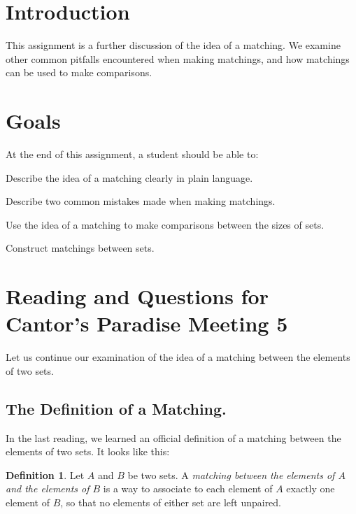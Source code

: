 \documentclass[12pt,letterpaper]{article}
\theoremstyle{definition}
\newtheorem*{definition}{Definition}
\begin{document}
\setlength{\parskip}{1ex plus 0.5ex minus 0.2ex}
\setlength{\parindent}{0pt}

\pagestyle{fancy}
\cfoot{}

\section*{Introduction}
This assignment is a further discussion of the idea of a matching.
We examine other common pitfalls encountered when making matchings, and how matchings can be used to make comparisons.

\section*{Goals}
At the end of this assignment, a student should be able to:
\begin{compactitem}
\item Describe the idea of a matching clearly in plain language.
\item Describe two common mistakes made when making matchings.
\item Use the idea of a matching to make comparisons between the sizes of sets.
\item Construct matchings between sets.
\end{compactitem}


\section*{Reading and Questions for Cantor's Paradise Meeting 5}

Let us continue our examination of the idea of a matching between the elements of two sets.

\subsection*{The Definition of a Matching.}
In the last reading, we learned an official definition of a matching between the elements of two sets.
It looks like this:
\begin{definition}
Let $A$ and $B$ be two sets.
A \emph{matching between the elements of $A$ and the elements of $B$} is a way to associate to each element of $A$ exactly one element of $B$, so that no elements of either set are left unpaired.
\end{definition}
\end{document}
